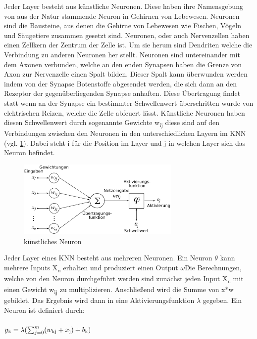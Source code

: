 \documentclass{llncs}
\begin{document}
Jeder Layer besteht aus künstliche Neuronen. Diese haben ihre Namensgebung von aus der Natur stammende Neuron in Gehirnen von Lebewesen. Neuronen sind die Bausteine, aus denen die Gehirne von Lebewesen wie Fischen, Vögeln und Säugetiere zusammen gesetzt sind. Neuronen, oder auch Nervenzellen haben einen Zellkern der Zentrum der Zelle ist. Um sie herum sind Dendriten welche die Verbindung zu anderen Neuronen her stellt. Neuronen sind untereinander mit dem Axonen verbunden, welche an den enden Synapsen haben die Grenze von Axon zur Nervenzelle einen Spalt bilden. Dieser Spalt kann überwunden werden indem von der Synapse Botenstoffe abgesendet werden, die sich dann an den Rezeptor der gegenüberliegenden Synapse anhaften. Diese Übertragung findet statt wenn an der Synapse ein bestimmter Schwellenwert überschritten wurde von elektrischen Reizen, welche die Zelle abfeuert lässt. Künstliche Neuronen haben diesen Schwellenwert durch sogenannte Gewichte w\textsubscript{ij} diese sind auf den Verbindungen zwischen den Neuronen in den unterschiedlichen Layern im KNN (vgl. \ref{fig:Bild2}). Dabei steht i für die Position im Layer und j in welchen Layer sich das Neuron befindet.
\begin{figure}[htbp] 
	\centering
	\includegraphics[width=0.7\textwidth]{Neuron.png}
	\caption{künstliches Neuron}
	\label{fig:Bild2}
\end{figure}
Jeder Layer eines KNN besteht aus mehreren Neuronen. Ein Neuron $\theta$ kann mehrere Inputs X\textsubscript{n} erhalten und produziert einen Output $\omega$\. Die Berechnungen, welche von den Neuron durchgeführt werden sind zunächst jeden Input X\textsubscript{n} mit einen Gewicht w\textsubscript{ij} zu multiplizieren. Anschließend wird die Summe von x*w gebildet. Das Ergebnis wird dann in eine Aktivierungsfunktion $\lambda$ gegeben. Ein Neuron ist definiert durch:
\\\\
\begin{math}
y\textsubscript{k} = \lambda(\sum_{j=0}^{m}(w\textsubscript{kj}+x\textsubscript{j})+b\textsubscript{k})                
\end{math}
\end{document}
